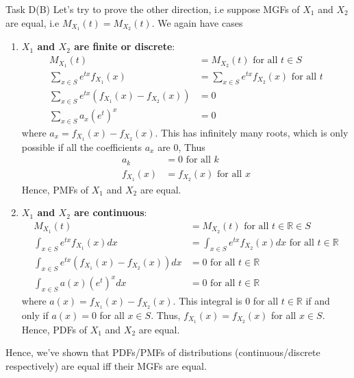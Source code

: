 \begin{task}{Task D(B)}
	Let's try to prove the other direction, i.e suppose MGFs of $X_1$ and
	$X_2$ are equal, i.e $M_{X_1}(t) = M_{X_2}(t)$. We again have cases
	\begin{enumerate}
		\item \textbf{$X_1$ and $X_2$ are finite or discrete}:
		      \begin{align}
			      M_{X_1}(t)                                     & = M_{X_2}(t) \text{ for all } t \in S               \\
			      \sum_{x\in S} e^{tx}f_{X_1}(x)                 & = \sum_{x\in S} e^{tx}f_{X_2}(x) \text{ for all } t \\
			      \sum_{x\in S} e^{tx} (f_{X_1}(x) - f_{X_2}(x)) & = 0                                                 \\
			      \sum_{x\in S} a_x(e^{t})^x                     & = 0
		      \end{align}
		      where $a_x=f_{X_1}(x)-f_{X_2}(x)$. This has infinitely many roots, which is only possible if all the coefficients $a_x$ are 0, Thus
		      \begin{align}
			      a_k        & = 0 \text{ for all } k          \\
			      f_{X_1}(x) & = f_{X_2}(x) \text{ for all } x
		      \end{align}
		      Hence, PMFs of $X_1$ and $X_2$ are equal.

		\item \textbf{$X_1$ and $X_2$ are continuous}:
		      \begin{align}
			      M_{X_1}(t)                                       & = M_{X_2}(t) \text{ for all } t \in \mathbb{R} \in S                                   \\
			      \int_{x\in S} e^{tx}f_{X_1}(x)dx                 & = \int_{x\in S} e^{tx}f_{X_2}(x)dx \text{ for all } t \in \mathbb{R}                   \\
			      \int_{x\in S} e^{tx} (f_{X_1}(x) - f_{X_2}(x))dx & = 0                                                  \text{ for all } t \in \mathbb{R} \\
			      \int_{x\in S} a(x)(e^{t})^x                   dx & = 0\text{ for all } t\in \mathbb{R}
		      \end{align}
		      where $a(x)=f_{X_1}(x)-f_{X_2}(x)$. This integral is 0 for all $t\in \mathbb{R}$ if and only if $a(x) = 0$ for all $x\in S$. Thus, $f_{X_1}(x) = f_{X_2}(x)$ for all $x\in S$.
		      Hence, PDFs of $X_1$ and $X_2$ are equal.
	\end{enumerate}
	Hence, we've shown that PDFs/PMFs of distributions (continuous/discrete respectively) are equal iff their MGFs are equal.
\end{task}
